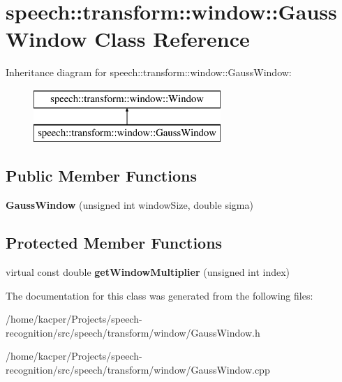 \hypertarget{classspeech_1_1transform_1_1window_1_1GaussWindow}{\section{speech\+:\+:transform\+:\+:window\+:\+:Gauss\+Window Class Reference}
\label{classspeech_1_1transform_1_1window_1_1GaussWindow}
}
Inheritance diagram for speech\+:\+:transform\+:\+:window\+:\+:Gauss\+Window\+:\begin{figure}[H]
\begin{center}
\leavevmode
\includegraphics[height=2.000000cm]{classspeech_1_1transform_1_1window_1_1GaussWindow}
\end{center}
\end{figure}
\subsection*{Public Member Functions}
\begin{DoxyCompactItemize}
\item 
\hypertarget{classspeech_1_1transform_1_1window_1_1GaussWindow_ab9bb9cbbb5d8414652ccc2306445f5bc}{{\bfseries Gauss\+Window} (unsigned int window\+Size, double sigma)}\label{classspeech_1_1transform_1_1window_1_1GaussWindow_ab9bb9cbbb5d8414652ccc2306445f5bc}

\end{DoxyCompactItemize}
\subsection*{Protected Member Functions}
\begin{DoxyCompactItemize}
\item 
\hypertarget{classspeech_1_1transform_1_1window_1_1GaussWindow_a3cad13f188cdcebcdfe00df65a6b9e6e}{virtual const double {\bfseries get\+Window\+Multiplier} (unsigned int index)}\label{classspeech_1_1transform_1_1window_1_1GaussWindow_a3cad13f188cdcebcdfe00df65a6b9e6e}

\end{DoxyCompactItemize}


The documentation for this class was generated from the following files\+:\begin{DoxyCompactItemize}
\item 
/home/kacper/\+Projects/speech-\/recognition/src/speech/transform/window/Gauss\+Window.\+h\item 
/home/kacper/\+Projects/speech-\/recognition/src/speech/transform/window/Gauss\+Window.\+cpp\end{DoxyCompactItemize}
